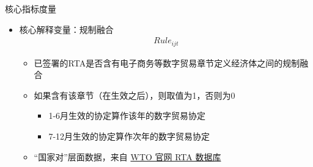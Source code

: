 \documentclass{beamer}
\begin{document}
\begin{frame}{核心指标度量}
    \begin{itemize}
        \item \large 核心解释变量：规制融合
        \begin{align*}
            Rule_{ijt}
        \end{align*}
        \begin{itemize}
            \item 已签署的RTA是否含有电子商务等数字贸易章节定义经济体之间的规制融合
            \item 如果含有该章节（在生效之后），则取值为1，否则为0
            \begin{itemize}
                \item 1-6月生效的协定算作该年的数字贸易协定
                \item 7-12月生效的协定算作次年的数字贸易协定
            \end{itemize}
            \item “国家对”层面数据，来自 \underline{WTO 官网 RTA 数据库}
        \end{itemize}
    \end{itemize}
\end{frame}
\end{document}
